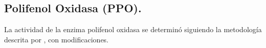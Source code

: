 %
%
%
%
%
%
%


\subsection{Polifenol Oxidasa (PPO).}

La actividad de la enzima polifenol oxidasa se determin\'o siguiendo la metodolog\'ia descrita por \cite{baquero2005catalase}, con modificaciones.\\

